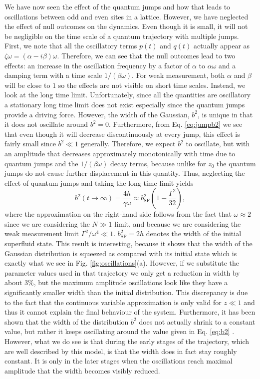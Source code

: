 We have now seen the effect of the quantum jumps and how that leads to
oscillations between odd and even sites in a lattice. However, we have
neglected the effect of null outcomes on the dynamics. Even though it
is small, it will not be negligible on the time scale of a quantum
trajectory with multiple jumps. First, we note that all the
oscillatory terms $p(t)$ and $q(t)$ actually appear as
$\zeta \omega = (\alpha - i \beta) \omega$. Therefore, we can see that
the null outcomes lead to two effects: an increase in the oscillation
frequency by a factor of $\alpha$ to $\alpha \omega$ and a damping
term with a time scale $1/(\beta \omega)$. For weak measurement, both
$\alpha$ and $\beta$ will be close to $1$ so the effects are not
visible on short time scales. Instead, we look at the long time
limit. Unfortunately, since all the quantities are oscillatory a
stationary long time limit does not exist especially since the quantum
jumps provide a driving force. However, the width of the Gaussian,
$b^2$, is unique in that it does not oscillate around $b^2 =
0$. Furthermore, from Eq. \eqref{eq:jumpb2} we see that even though it
will decrease discontinuously at every jump, this effect is fairly
small since $b^2 \ll 1$ generally. Therefore, we expect $b^2$ to
oscillate, but with an amplitude that decreases approximately
monotonically with time due to quantum jumps and the
$1/(\beta \omega)$ decay terms, because unlike for $z_0$ the quantum
jumps do not cause further displacement in this quantity. Thus,
neglecting the effect of quantum jumps and taking the long time limit
yields
\begin{equation}
  \label{eq:b2}
  b^2(t \rightarrow \infty) = \frac{4 h} {\gamma \omega} \approx
  b^2_\mathrm{SF} \left( 1 - \frac{\Gamma^2}{32} \right),
\end{equation}
where the approximation on the right-hand side follows from the fact
that $\omega \approx 2$ since we are considering the $N \gg 1$ limit,
and because we are considering the weak measurement limit $\Gamma^2 /
\omega^4 \ll 1$. $b^2_\mathrm{SF} = 2h$ denotes the width of the
initial superfluid state. This result is interesting, because it shows
that the width of the Gaussian distribution is squeezed as compared
with its initial state which is exactly what we see in
Fig. \ref{fig:oscillations}(a). However, if we substitute the
parameter values used in that trajectory we only get a reduction in
width by about $3\%$, but the maximum amplitude oscillations look like
they have a significantly smaller width than the initial
distribution. This discrepancy is due to the fact that the continuous
variable approximation is only valid for $z \ll 1$ and thus it cannot
explain the final behaviour of the system. Furthermore, it has been
shown that the width of the distribution $b^2$ does not actually
shrink to a constant value, but rather it keeps oscillating around the
value given in Eq. \eqref{eq:b2} \cite{mazzucchi2016njp}. However,
what we do see is that during the early stages of the trajectory,
which are well described by this model, is that the width does in fact
stay roughly constant. It is only in the later stages when the
oscillations reach maximal amplitude that the width becomes visibly
reduced.

